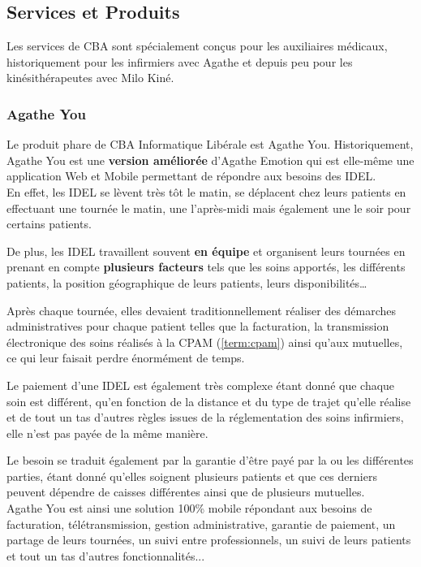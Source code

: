 \documentclass{article}
\begin{document}
\newpage

\subsection{Services et Produits}

Les services de CBA sont spécialement conçus pour les auxiliaires médicaux, historiquement pour les infirmiers avec Agathe et depuis peu pour les kinésithérapeutes avec Milo Kiné.

\subsubsection{Agathe You}

Le produit phare de CBA Informatique Libérale est Agathe You.
Historiquement, Agathe You est une \textbf{version améliorée} d'Agathe Emotion qui est elle-même une application Web et Mobile permettant de répondre aux besoins des IDEL. \\

En effet, les IDEL se lèvent très tôt le matin, se déplacent chez leurs patients en effectuant une tournée le matin, une l'après-midi mais également une le soir pour certains patients.

De plus, les IDEL travaillent souvent \textbf{en équipe} et organisent leurs tournées en prenant en compte \textbf{plusieurs facteurs} tels que les soins apportés, les différents patients, la position géographique de leurs patients, leurs disponibilités…

Après chaque tournée, elles devaient traditionnellement réaliser des démarches administratives pour chaque patient telles que la facturation, la transmission électronique des soins réalisés à la CPAM (\ref{term:cpam}) ainsi qu'aux mutuelles, ce qui leur faisait perdre énormément de temps.

Le paiement d'une IDEL est également très complexe étant donné que chaque soin est différent, qu'en fonction de la distance et du type de trajet qu'elle réalise et de tout un tas d'autres règles issues de la réglementation des soins infirmiers, elle n'est pas payée de la même manière.

Le besoin se traduit également par la garantie d'être payé par la ou les différentes parties, étant donné qu'elles soignent plusieurs patients et que ces derniers peuvent dépendre de caisses différentes ainsi que de plusieurs mutuelles. \\

Agathe You est ainsi une solution 100\% mobile répondant aux besoins de facturation, télétransmission, gestion administrative, garantie de paiement, un partage de leurs tournées, un suivi entre professionnels, un suivi de leurs patients et tout un tas d'autres fonctionnalités... \\
\end{document}
